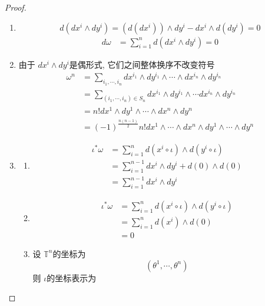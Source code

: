 \documentclass[../main.tex]{subfiles}
\begin{document}
\begin{proof}
   \begin{enumerate}
    \item   \[
    d\left( dx^{i}\wedge dy^{i} \right)= \left( d\left( dx^{i} \right)  \right)\wedge dy^{i}- dx^{i}\wedge d\left( dy^{i} \right)= 0   
    \] \[
    \begin{aligned}
    d \omega &= \sum _{i= 1}^{n}d\left( dx^{i}\wedge dy^{i} \right)  = 0
    \end{aligned}
    \]
    \item 由于 \(  dx^{i}\wedge dy^{i}  \)是偶形式, 它们之间整体换序不改变符号 \[
     \begin{aligned}
     \omega ^{n}&=  \sum _{i_1,\cdots ,i_{n}} dx^{i_1}\wedge dy^{i_1}\wedge \cdots \wedge dx^{i_{n}}\wedge dy^{i_{n}} \\ 
      &= \sum _{\left( i_1,\cdots ,i_{n} \right)\in S_{n} }d x^{i_1}\wedge  dy^{i_1}\wedge \cdots dx^{i_{n}}\wedge dy^{i_{n}}\\ 
       &= n! dx^{1}\wedge dy^{1}\wedge \cdots \wedge dx^{n}\wedge dy^{n}\\ 
        &= \left( -1 \right)^{\frac{n\left( n-1 \right)  }{ 2} }n!dx^{1}\wedge \cdots \wedge dx^{n}\wedge dy^{1}\wedge \cdots \wedge dy^{n} 
     \end{aligned}
    \]
    \item \begin{enumerate}
        \item  \[
   \begin{aligned}
    \iota ^{*} \omega &= \sum _{i= 1}^{n}d \left( x^{i}\circ \iota  \right)\wedge d\left( y^{i}\circ \iota  \right)   \\ 
     &= \sum _{i= 1}^{n-1}dx^{i}\wedge dy^{i}+ d\left( 0 \right)\wedge d\left( 0 \right)\\ 
      &= \sum _{i= 1}^{n-1}dx^{i}\wedge dy^{i}  
   \end{aligned}
    \]
    \item \[
\begin{aligned}
    \iota ^{*} \omega &= \sum _{i= 1}^{n}d \left( x^{i}\circ  \iota  \right)\wedge d\left( y^{i}\circ \iota  \right)   \\ 
     &= \sum _{i= 1}^{n}d\left( x^{i} \right)\wedge d\left( 0 \right)  \\ 
      &= 0
\end{aligned}    \]
\item 设 \(  \mathbb{T}^{n}  \)的坐标为 \[
\left(  \theta ^{1},\cdots , \theta ^{n} \right) 
\] 则 \(  \iota   \)的坐标表示为 \[
\]
\end{enumerate}
\end{enumerate}
\end{proof}
\end{document}
